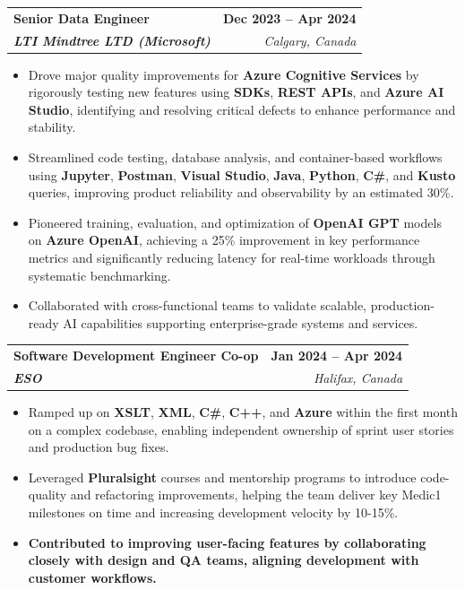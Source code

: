 \documentclass[letterpaper,11pt]{article}
\makeatletter
\newcommand{\resumeItem}[1]{
  \item\small{
    {#1 \vspace{-2pt}}
  }
}
\newcommand{\resumeSubheading}[4]{
  \vspace{-2pt}\item
    \begin{tabular*}{1.0\textwidth}[t]{l@{\extracolsep{\fill}}r}
      \textbf{#1} & \textbf{\small #2} \\
      \textit{\small#3} & \textit{\small #4} \\
    \end{tabular*}\vspace{-7pt}
}
\newcommand{\resumeItemListStart}{\begin{itemize}}
\newcommand{\resumeItemListEnd}{\end{itemize}\vspace{-5pt}}
\makeatother
\begin{document}
    \resumeSubheading
      {\textbf{Senior Data Engineer}}{\textbf{Dec 2023 -- Apr 2024}}
      {\textbf{LTI Mindtree LTD (Microsoft)}}{Calgary, Canada}
      \resumeItemListStart
        \resumeItem{Drove major quality improvements for \textbf{Azure Cognitive Services} by rigorously testing new features using \textbf{SDKs}, \textbf{REST APIs}, and \textbf{Azure AI Studio}, identifying and resolving critical defects to enhance performance and stability.}
        \resumeItem{Streamlined code testing, database analysis, and container-based workflows using \textbf{Jupyter}, \textbf{Postman}, \textbf{Visual Studio}, \textbf{Java}, \textbf{Python}, \textbf{C\#}, and \textbf{Kusto} queries, improving product reliability and observability by an estimated 30\%.}
        \resumeItem{Pioneered training, evaluation, and optimization of \textbf{OpenAI GPT} models on \textbf{Azure OpenAI}, achieving a 25\% improvement in key performance metrics and significantly reducing latency for real-time workloads through systematic benchmarking.}
        \resumeItem{Collaborated with cross-functional teams to validate scalable, production-ready AI capabilities supporting enterprise-grade systems and services.}
      \resumeItemListEnd
    
    \resumeSubheading
      {\textbf{Software Development Engineer Co-op}}{\textbf{Jan 2024 -- Apr 2024}}
      {\textbf{ESO}}{Halifax, Canada}
      \resumeItemListStart
        \resumeItem{Ramped up on \textbf{XSLT}, \textbf{XML}, \textbf{C\#}, \textbf{C++}, and \textbf{Azure} within the first month on a complex codebase, enabling independent ownership of sprint user stories and production bug fixes.}
        \resumeItem{Leveraged \textbf{Pluralsight} courses and mentorship programs to introduce code-quality and refactoring improvements, helping the team deliver key Medic1 milestones on time and increasing development velocity by 10-15\%.}
        \resumeItem{\textbf{Contributed to improving user-facing features by collaborating closely with design and QA teams, aligning development with customer workflows.}}
      \resumeItemListEnd
\end{document}
